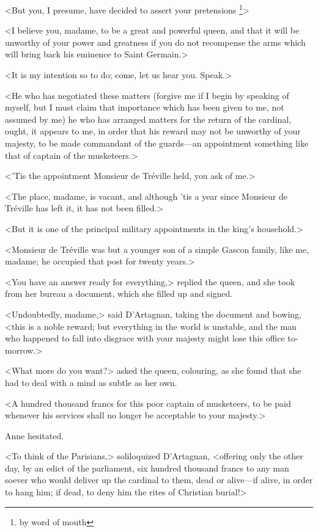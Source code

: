 <But you, I presume, have decided to assert your pretensions \footnote{by word of mouth}>

<I believe you, madame, to be a great and powerful queen, and that it will be unworthy of your power and greatness if you do not recompense the arms which will bring back his eminence to Saint Germain.>

<It is my intention so to do; come, let us hear you. Speak.>

<He who has negotiated these matters (forgive me if I begin by speaking of myself, but I must claim that importance which has been given to me, not assumed by me) he who has arranged matters for the return of the cardinal, ought, it appears to me, in order that his reward may not be unworthy of your majesty, to be made commandant of the guards—an appointment something like that of captain of the musketeers.>

<'Tis the appointment Monsieur de Tréville held, you ask of me.>

<The place, madame, is vacant, and although 'tis a year since Monsieur de Tréville has left it, it has not been filled.>

<But it is one of the principal military appointments in the king's household.>

<Monsieur de Tréville was but a younger son of a simple Gascon family, like me, madame; he occupied that post for twenty years.>

<You have an answer ready for everything,> replied the queen, and she took from her bureau a document, which she filled up and signed.

<Undoubtedly, madame,> said D'Artagnan, taking the document and bowing, <this is a noble reward; but everything in the world is unstable, and the man who happened to fall into disgrace with your majesty might lose this office to-morrow.>

<What more do you want?> asked the queen, colouring, as she found that she had to deal with a mind as subtle as her own.

<A hundred thousand francs for this poor captain of musketeers, to be paid whenever his services shall no longer be acceptable to your majesty.>

Anne hesitated.

<To think of the Parisians,> soliloquized D'Artagnan, <offering only the other day, by an edict of the parliament, six hundred thousand francs to any man soever who would deliver up the cardinal to them, dead or alive—if alive, in order to hang him; if dead, to deny him the rites of Christian burial!>


